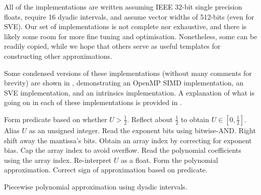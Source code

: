 \documentclass[11pt,a4paper,twoside,english]{extarticle}
\begin{document}
All of the implementations are written assuming IEEE 32-bit single precision floats, require 16 dyadic intervals, and assume vector widths of 512-bits (even for SVE). Our set of implementations is not complete nor exhaustive, and there is likely some room for more fine tuning and optimisation. Nonetheless, some can be readily copied, while we hope that others serve as useful templates for constructing other approximations. 

Some condensed versions of these implementations (without many comments for brevity) are shown in , demonstrating an OpenMP SIMD implementation, an \arm SVE implementation, and an \intel intrinsics implementation. A explanation of what is going on in each of these implementations is provided in .

\begin{algorithm}[H]
\DontPrintSemicolon
\KwIn{Floating-point uniform random number $ U \in [0, 1) $.}
Form predicate based on whether $ U > \tfrac{1}{2} $.\;
Reflect about $ \tfrac{1}{2} $ to obtain $ U \in [0, \tfrac{1}{2}] $.\;
Alias $ U $ as an unsigned integer.\;
Read the exponent bits using bitwise-AND.\;
Right shift away the mantissa's bits.\;
Obtain an array index by correcting for exponent bias.\;
Cap the array index to avoid overflow.\;
Read the polynomial coefficients using the array index.\;
Re-interpret $ U $ as a float.\;
Form the polynomial approximation.\;
Correct sign of approximation based on predicate.\;
\caption[Piecewise polynomial approximation using dyadic intervals]{Piecewise polynomial approximation using dyadic intervals.}
\label{algo:piecewise_polynomial_approx_using_dyadic_intervals}
\end{algorithm}
\end{document}

